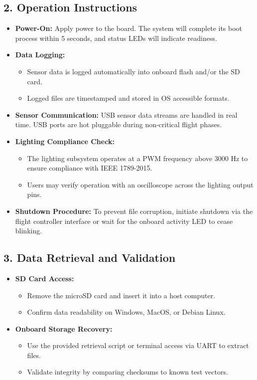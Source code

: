 \documentclass[12pt]{article}
\begin{document}
\subsection*{2. Operation Instructions}

\begin{itemize}
    \item \textbf{Power-On:} Apply power to the board. The system will complete its boot process within 5 seconds, and status LEDs will indicate readiness.
    \item \textbf{Data Logging:}
    \begin{itemize}
        \item Sensor data is logged automatically into onboard flash and/or the SD card.
        \item Logged files are timestamped and stored in OS accessible formats.
    \end{itemize}
    \item \textbf{Sensor Communication:} USB sensor data streams are handled in real time. USB ports are hot pluggable during non-critical flight phases.
    \item \textbf{Lighting Compliance Check:}
    \begin{itemize}
        \item The lighting subsystem operates at a PWM frequency above 3000 Hz to ensure compliance with IEEE 1789-2015.
        \item Users may verify operation with an oscilloscope across the lighting output pins.
    \end{itemize}
    \item \textbf{Shutdown Procedure:} To prevent file corruption, initiate shutdown via the flight controller interface or wait for the onboard activity LED to cease blinking.
\end{itemize}

\subsection*{3. Data Retrieval and Validation}

\begin{itemize}
    \item \textbf{SD Card Access:}
    \begin{itemize}
        \item Remove the microSD card and insert it into a host computer.
        \item Confirm data readability on Windows, MacOS, or Debian Linux.
    \end{itemize}
    \item \textbf{Onboard Storage Recovery:}
    \begin{itemize}
        \item Use the provided retrieval script or terminal access via UART to extract files.
        \item Validate integrity by comparing checksums to known test vectors.
    \end{itemize}
\end{itemize}
\end{document}
